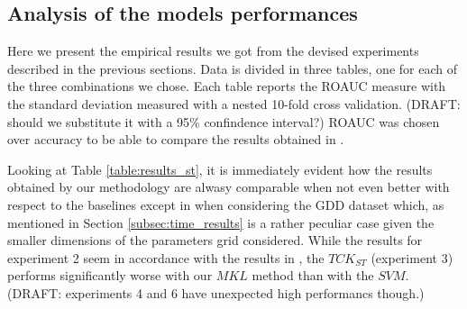 \subsection{Analysis of the models performances}

Here we present the empirical results we got from the devised experiments described
in the previous sections.
Data is divided in three tables, one for each of the three combinations we chose.
Each table reports the ROAUC measure with the standard deviation measured with
a nested 10-fold cross validation. (DRAFT: should we substitute it with a 95\% confindence interval?)
ROAUC was chosen over accuracy to be able to compare the results obtained in \cite{gmkl}.

Looking at Table \ref{table:results_st}, it is immediately evident how the results
obtained by our methodology are alwasy comparable when not even better with respect
to the baselines except in when considering the GDD dataset which, as mentioned in
Section \ref{subsec:time_results} is a rather peculiar case given the smaller dimensions
of the parameters grid considered.
While the results for experiment 2 seem in accordance with the results in \cite{gmkl},
the $TCK_{ST}$ (experiment 3) performs significantly worse with our $MKL$ method than with
the $SVM$.
(DRAFT: experiments 4 and 6 have unexpected high performancs though.)

